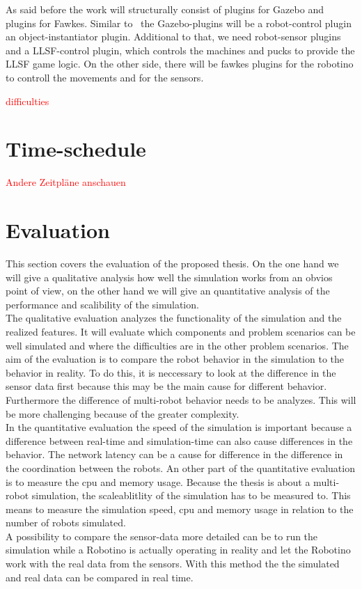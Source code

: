 \documentclass[11pt,a4paper,titlepage]{article}
\begin{document}
As said before the work will structurally consist of plugins for Gazebo and plugins for Fawkes. Similar to~\cite{KlingenDA} the Gazebo-plugins will be a robot-control plugin an object-instantiator plugin. Additional to that, we need robot-sensor plugins and a LLSF-control plugin, which controls the machines and pucks to provide the LLSF game logic. On the other side, there will be fawkes plugins for the robotino to controll the movements and for the sensors.

\textcolor{red}{difficulties} 

\section{Time-schedule}
\textcolor{red}{Andere Zeitpläne anschauen}

\section{Evaluation}
This section covers the evaluation of the proposed thesis. On the one hand we will give a qualitative analysis how well the simulation works from an obvios point of view, on the other hand we will give an quantitative analysis of the performance and scalibility of the simulation.\\
The qualitative evaluation analyzes the functionality of the simulation and the realized features. It will evaluate which components and problem scenarios can be well simulated and where the difficulties are in the other problem scenarios. The aim of the evaluation is to compare the robot behavior in the simulation to the behavior in reality. To do this, it is neccessary to look at the difference in the sensor data first because this may be the main cause for different behavior. Furthermore the difference of multi-robot behavior needs to be analyzes. This will be more challenging because of the greater complexity.\\
In the quantitative evaluation the speed of the simulation is important because a difference between real-time and simulation-time can also cause differences in the behavior. The network latency can be a cause for difference in the difference in the coordination between the robots. An other part of the quantitative evaluation is to measure the cpu and memory usage. Because the thesis is about a multi-robot simulation, the scaleablitlity of the simulation has to be measured to. This means to measure the simulation speed, cpu and memory usage in relation to the number of robots simulated.\\
A possibility to compare the sensor-data more detailed can be to run the simulation while a Robotino is actually operating in reality and let the Robotino work with the real data from the sensors. With this method the the simulated and real data can be compared in real time.
\end{document}
